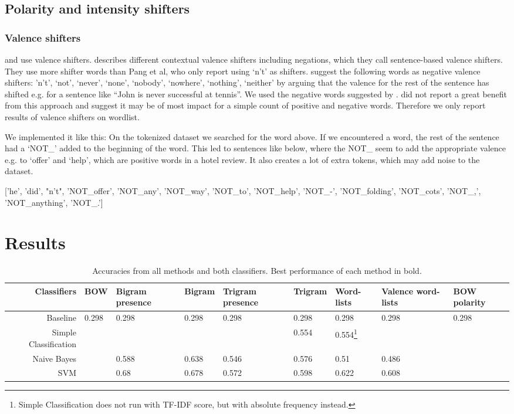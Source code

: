 \documentclass{article}
\begin{document}
\subsection{Polarity and intensity shifters}

\subsubsection{Valence shifters}
\cite{pangetal} and \cite{kennedy} use valence shifters. \cite{polanyi} describes different contextual valence shifters including negations, which they call sentence-based valence shifters. They use more shifter words than Pang et al, who only report using ‘n’t’ as shifters. \cite{polanyi} suggest the following words as negative valence shifters: 'n’t’, ‘not’, ‘never’, ‘none’, ‘nobody’, ‘nowhere’, ‘nothing’, ‘neither’ by arguing that the valence for the rest of the sentence has shifted e.g. for a sentence like “John is never successful at tennis”. We used the negative words suggested by \cite{polanyi}. \cite{pangetal} did not report a great benefit from this approach and \cite{kennedy} suggest it may be of most impact for a simple count of positive and negative words. Therefore we only report results of valence shifters on wordlist. 

We implemented it like this: On the tokenized dataset we searched for the word above. If we encountered a word, the rest of the sentence had a ‘NOT\_’ added to the beginning of the word. This led to sentences like below, where the NOT\_ seem to add the appropriate valence e.g. to ‘offer’ and ‘help’, which are positive words in a hotel review. It also creates a lot of extra tokens, which may add noise to the dataset. 

['he', 'did', "n't", 'NOT\_offer', 'NOT\_any', 'NOT\_way', 'NOT\_to', 'NOT\_help', 'NOT\_-', 'NOT\_folding', 'NOT\_cots', 'NOT\_,', 'NOT\_anything', 'NOT\_.']

\section{Results}
\begin{table}[ht!]
  \centering
  \begin{tabular}{ | r | p{10mm} | p{10mm} | p{10mm} | p{10mm} | p{10mm} | p{10mm} | p{10mm} | p{10mm} | }
Classifiers & BOW & Bigram presence & Bigram & Trigram presence & Trigram & Word-lists & Valence word-lists
& BOW polarity \\
\hline \hline
Baseline&0.298&0.298&0.298&0.298&0.298&0.298&0.298&0.298\\
\hline
Simple Classification&&&&& 0.554 &0.554\footnote{Simple Classification does not run with TF-IDF score, but with absolute frequency instead.} &&\\
\hline
Naive Bayes& &0.588&0.638&0.546&0.576&0.51&0.486&\\
\hline
SVM&&0.68&0.678&0.572&0.598&0.622&0.608&\\
\hline
  \end{tabular}
  \caption{Accuracies from all methods and both classifiers. Best performance of each method in bold. }
  \label{tab:resultsfinal}
\end{table}
\end{document}
